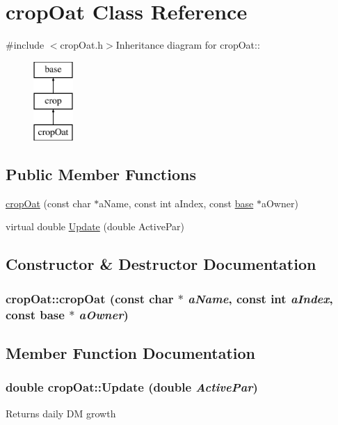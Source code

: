 \hypertarget{classcrop_oat}{
\section{cropOat Class Reference}
\label{classcrop_oat}
}


{\ttfamily \#include $<$cropOat.h$>$}Inheritance diagram for cropOat::\begin{figure}[H]
\begin{center}
\leavevmode
\includegraphics[height=3cm]{classcrop_oat}
\end{center}
\end{figure}
\subsection*{Public Member Functions}
\begin{DoxyCompactItemize}
\item 
\hyperlink{classcrop_oat_a0a3deaa59d7faf773777653ef5f09f18}{cropOat} (const char $\ast$aName, const int aIndex, const \hyperlink{classbase}{base} $\ast$aOwner)
\item 
virtual double \hyperlink{classcrop_oat_ae7850c3901966142a6ada63470313e5a}{Update} (double ActivePar)
\end{DoxyCompactItemize}


\subsection{Constructor \& Destructor Documentation}
\hypertarget{classcrop_oat_a0a3deaa59d7faf773777653ef5f09f18}{
\subsubsection[{cropOat}]{\setlength{\rightskip}{0pt plus 5cm}cropOat::cropOat (const char $\ast$ {\em aName}, \/  const int {\em aIndex}, \/  const {\bf base} $\ast$ {\em aOwner})}}
\label{classcrop_oat_a0a3deaa59d7faf773777653ef5f09f18}


\subsection{Member Function Documentation}
\hypertarget{classcrop_oat_ae7850c3901966142a6ada63470313e5a}{
\subsubsection[{Update}]{\setlength{\rightskip}{0pt plus 5cm}double cropOat::Update (double {\em ActivePar})}}
\label{classcrop_oat_ae7850c3901966142a6ada63470313e5a}
Returns daily DM growth 

